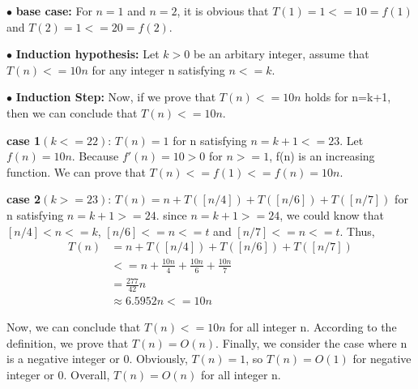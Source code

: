 \documentclass[12pt,a4paper]{article}
\begin{document}
		$\bullet$ \textbf{base case:}
		For $n=1$ and $n=2$, it is obvious that $T(1)=1<=10=f(1)$ and $T(2)=1<=20=f(2)$.


		$\bullet$ \textbf{Induction hypothesis:}
		Let $k>0$ be an arbitary integer, assume that $T(n)<=10n$ for any integer n satisfying $n<=k$.

		
		$\bullet$ \textbf{Induction Step:}
		Now, if we prove that $T(n)<=10n$ holds for n=k+1, then we can conclude that $T(n)<=10n$.


		
		\textbf{case 1$(k<=22)$}:
		$T(n)=1$ for n satisfying $n=k+1<=23$. Let $f(n)=10n$. Because $f'(n)=10>0$ for $n>=1$, f(n) is an increasing function. We can prove that $T(n)<=f(1)<=f(n)=10n$.

		
		\textbf{case 2$(k>=23)$}:
		$T(n)=n+T([n/4])+T([n/6])+T([n/7])$ for n satisfying $n=k+1>=24$. since $n=k+1>=24$, we could know that $[n/4]<n<=k$, $[n/6]<=n<=t$ and $[n/7]<=n<=t$. Thus, 
		\begin{align*}
 		T(n)&=n+T([n/4])+T([n/6])+T([n/7]) \\
		&<=n + \frac{10n}{4}  + \frac{10n}{6} + \frac{10n}{7}\\
		&= \frac{277}{42}n\\
		&\approx 6.5952n<=10n
		\end{align*}

		Now, we can conclude that 	$T(n)<=10n$ for all integer n. According to the definition, we prove that $T(n)=O(n)$. Finally, we consider the case where n is a negative integer or 0. Obviously, $T(n)=1$, so $T(n)=O(1)$ for negative integer or 0. Overall, $T(n)=O(n)$ for all integer n.
\end{document}
